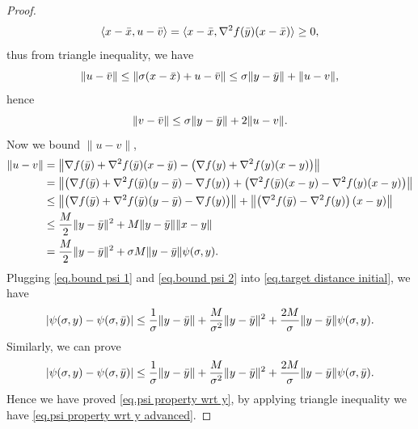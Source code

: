 \documentclass{article}
\begin{document}
\begin{proof}
\begin{equation*}
        \langle x-\Bar{x},u-\Bar{v}\rangle = \langle x-\Bar{x},\nabla ^2 f(\Bar{y})(x-\Bar{x})\rangle\geq 0,
    \end{equation*}
    thus from triangle inequality, we have
    \begin{equation*}
        \|u-\Bar{v}\| \leq \|\sigma(x-\Bar{x})+u-\Bar{v}\| \leq \sigma \|y-\Bar{y}\|+\|u-v\|,
    \end{equation*}
    hence 
    \begin{equation}\label{eq.bound psi 1}
        \|v-\Bar{v}\| \leq \sigma\|y-\Bar{y}\| +2\|u-v\|.
    \end{equation}
    Now we bound $\|u-v\|$,
    \begin{equation}\label{eq.bound psi 2}
    \begin{aligned}
        \|u-v\| &= \left\|\nabla f(\Bar{y})+\nabla ^2 f(\Bar{y})(x-\Bar{y})-\left(\nabla f(y) + \nabla ^2 f(y)(x-y)\right)\right\|\\
        &= \left\|\left(\nabla f(\Bar{y})+\nabla^2 f(\Bar{y})(y-\Bar{y})-\nabla f(y)\right)+\left(\nabla^2 f(\Bar{y})(x-y)-\nabla^2 f(y)(x-y)\right)\right\|\\
        &\leq \left\|\left(\nabla f(\Bar{y})+\nabla^2 f(\Bar{y})(y-\Bar{y})-\nabla f(y)\right)\right \| +\left \|\left(\nabla^2 f(\Bar{y})-\nabla^2 f(y)\right)\left(x-y\right)\right\|\\
        &\leq \frac{M}{2}\|y-\Bar{y}\|^2+M\|y-\Bar{y}\|\|x-y\|\\
        &=\frac{M}{2}\|y-\Bar{y}\|^2+\sigma M \|y-\Bar{y}\|\psi(\sigma,y).
    \end{aligned}
    \end{equation}
    Plugging \eqref{eq.bound psi 1} and \eqref{eq.bound psi 2} into \eqref{eq.target distance initial}, we have
    \begin{equation*}
        \left \vert \psi(\sigma,y)-\psi(\sigma,\Bar{y}) \right\vert \leq \frac{1}{\sigma}\|y-\Bar{y}\| +\frac{M}{\sigma^2}\|y-\Bar{y}\|^2 +\frac{2M}{\sigma}\|y-\Bar{y}\|\psi(\sigma,y).
    \end{equation*}
    Similarly, we can prove
    \begin{equation*}
        \left \vert \psi(\sigma,y)-\psi(\sigma,\Bar{y}) \right\vert \leq \frac{1}{\sigma}\|y-\Bar{y}\| +\frac{M}{\sigma^2}\|y-\Bar{y}\|^2 +\frac{2M}{\sigma}\|y-\Bar{y}\|\psi(\sigma,\Bar{y}).
    \end{equation*}
    Hence we have proved \eqref{eq.psi property wrt y}, by applying triangle inequality we have \eqref{eq.psi property wrt y advanced}.
\end{proof}
\end{document}
